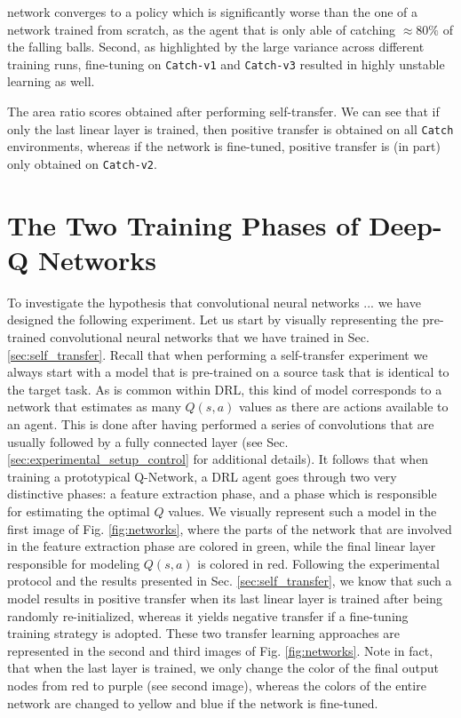 network converges to a policy which is significantly worse than the one of a network trained from scratch, as the agent that is only able of catching $\approx 80\%$ of the falling balls. Second, as highlighted by the large variance across different training runs, fine-tuning on \texttt{Catch-v1} and \texttt{Catch-v3} resulted in highly unstable learning as well.    



\begin{table}
	\centering
	\caption{The area ratio scores obtained after performing self-transfer. We can see that if only the last linear layer is trained, then positive transfer is obtained on all \texttt{Catch} environments, whereas if the network is fine-tuned, positive transfer is (in part) only obtained on \texttt{Catch-v2}.}
	
	\label{tab:self_tl_area_ratio}
\end{table}

\section{The Two Training Phases of Deep-Q Networks}
\label{sec:hybrid_self_transfer}

To investigate the hypothesis that convolutional neural networks ... we have designed the following experiment. Let us start by visually representing the pre-trained convolutional neural networks that we have trained in Sec. \ref{sec:self_transfer}. Recall that when performing a self-transfer experiment we always start with a model that is pre-trained on a source task that is identical to the target task. As is common within DRL, this kind of model corresponds to a network that estimates as many $Q(s,a)$ values as there are actions available to an agent. This is done after having performed a series of convolutions that are usually followed by a fully connected layer (see Sec. \ref{sec:experimental_setup_control} for additional details). It follows that when training a prototypical Q-Network, a DRL agent goes through two very distinctive phases: a feature extraction phase, and a phase which is responsible for estimating the optimal $Q$ values. We visually represent such a model in the first image of Fig. \ref{fig:networks}, where the parts of the network that are involved in the feature extraction phase are colored in green, while the final linear layer responsible for modeling $Q(s,a)$ is colored in red. Following the experimental protocol and the results presented in Sec. \ref{sec:self_transfer}, we know that such a model results in positive transfer when its last linear layer is trained after being randomly re-initialized, whereas it yields negative transfer if a fine-tuning training strategy is adopted. These two transfer learning approaches are represented in the second and third images of Fig. \ref{fig:networks}. Note in fact, that when the last layer is trained, we only change the color of the final output nodes from red to purple (see second image), whereas the colors of the entire network are changed to yellow and blue if the network is fine-tuned.  

